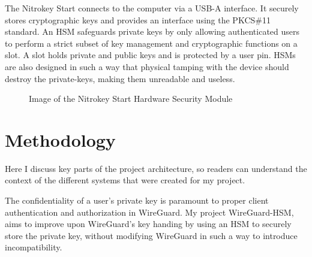 \documentclass [11pt, proquest] {uwthesis}[2020/02/24]
\begin{document}
The Nitrokey Start connects to the computer via a USB-A interface. It securely stores cryptographic keys and provides an interface using the PKCS\#11 standard.
An HSM safeguards private keys by only allowing authenticated users to perform a strict subset of key management and cryptographic functions on a slot. A slot holds private and public keys and is protected by a user pin. HSMs are also designed in such a way that physical tamping with the device should destroy the private-keys, making them unreadable and useless. 
\begin{figure}[ht]
\caption{Image of the Nitrokey Start Hardware Security Module}
\label{img:nitrokey}
\end{figure}

\chapter {Methodology}
Here I discuss key parts of the project architecture, so readers can understand the context of the different systems that were created for my project.

The confidentiality of a user's private key is paramount to proper client authentication and authorization in WireGuard. My project WireGuard-HSM, aims to improve upon WireGuard's key handing by using an HSM to securely store the private key, without modifying WireGuard in such a way to introduce incompatibility.
\end{document}

